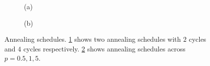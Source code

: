 \captionsetup[subfigure]{labelformat=empty}
\begin{figure}[t!]
    \centering 
\begin{subfigure}[b]{.48\textwidth} 
    \caption{(a)\label{fig:aschedc}}
\end{subfigure}
\hfill
\centering
\begin{subfigure}[b]{0.48\textwidth}
    \caption{(b)\label{fig:aschedp}}
\end{subfigure}

\caption{Annealing schedules. \cref{fig:aschedc} shows two annealing schedules with $2$ cycles and $4$ cycles respectively. \cref{fig:aschedp} shows annealing schedules across $p  = 0.5, 1, 5$.}
\label{fig:acsched}
\end{figure}




